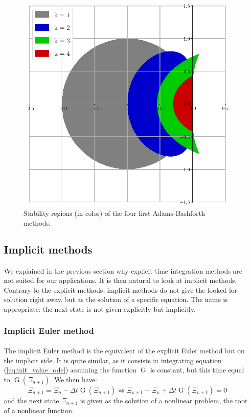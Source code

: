         \begin{figure}
          \centering
          \includegraphics[width=.6\textwidth]{figures/ab_stab.png}
          \caption{Stability regions (in color) of the four first Adams-Bashforth methods.}
          \label{fig:ab_stab}
        \end{figure}


    \subsection{Implicit methods}

      \paragraph{}
      We explained in the previous section why explicit time integration methods are not suited for our applications.
      It is then natural to look at implicit methods.
      Contrary to the explicit methods, implicit methods do not give the looked for solution right away, but as the solution of a specific equation.
      The name is appropriate: the next state is not given explicitly but implicitly.


      \subsubsection{Implicit Euler method}

        \paragraph{}
        The implicit Euler method is the equivalent of the explicit Euler method but on the implicit side.
        It is quite similar, as it consists in integrating equation (\ref{eq:init_value_ode}) assuming the function $\operatorname{G}$ is constant, but this time equal to $\operatorname{G}\left(\Xi_{n+1}\right)$.
        We then have:
        \begin{equation}
          \Xi_{n+1} = \Xi_n - \Delta t \operatorname{G}\left(\Xi_{n+1}\right)
          \Leftrightarrow \Xi_{n+1} - \Xi_n + \Delta t \operatorname{G}\left(\Xi_{n+1}\right) = 0
        \end{equation}
        and the next state $\Xi_{n+1}$ is given as the solution of a nonlinear problem, the root of a nonlinear function.

